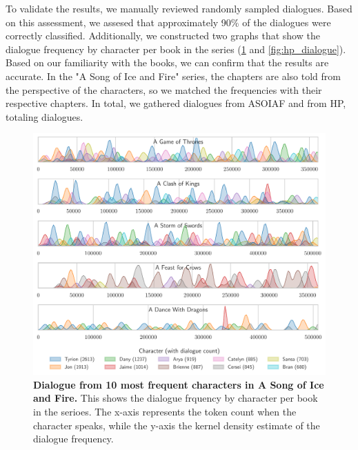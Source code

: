 \documentclass[fleqn,moreauthors,10pt]{ds_report}
\begin{document}
To validate the results, we manually reviewed randomly sampled dialogues. Based on this assessment, we assesed that approximately 90\% of the dialogues were correctly classified. Additionally, we constructed two graphs that show the dialogue frequency by character per book in the series (\cref{fig:asoif_dialogue} and \cref{fig:hp_dialogue}). Based on our familiarity with the books, we can confirm that the results are accurate. In the "A Song of Ice and Fire" series, the chapters are also told from the perspective of the characters, so we matched the frequencies with their respective chapters. In total, we gathered  dialogues from ASOIAF and  from HP, totaling  dialogues.

\begin{figure}[H]
	
	\centering
	\includegraphics[width=\linewidth]{asoif_dialogue.pdf}
	\caption{\textbf{Dialogue from 10 most frequent characters in A Song of Ice and Fire.} This shows the dialogue frquency by character per book in the serioes. The x-axis represents the token count when the character speaks, while the y-axis the kernel density estimate of the dialogue frequency.}
	\label{fig:asoif_dialogue}
\end{figure}
\end{document}
